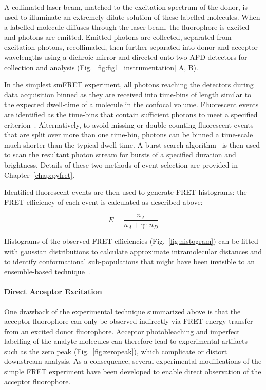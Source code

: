 A collimated laser beam, matched to the excitation spectrum of the donor, is used to illuminate an extremely dilute solution of these labelled molecules. When a labelled molecule diffuses through the laser beam, the fluorophore is excited and photons are emitted.  Emitted photons are collected, separated from excitation photons, recollimated, then further separated into donor and acceptor wavelengths using a dichroic mirror and directed onto two APD detectors for collection and analysis (Fig.~\ref{fig:fig1_instrumentation} A, B).

In the simplest smFRET experiment, all photons reaching the detectors during data acquisition binned as they are received into time-bins of length similar to the expected dwell-time of a molecule in the confocal volume. Fluorescent events are identified as the time-bins that contain sufficient photons to meet a specified criterion~\cite{weiss00}. Alternatively, to avoid missing or double counting fluorescent events that are split over more than one time-bin, photons can be binned a time-scale much shorter than the typical dwell time. A burst search algorithm~\cite{nir06} is then used to scan the resultant photon stream for bursts of a specified duration and brightness. Details of these two methods of event selection are provided in Chapter~\ref{chap:pyfret}.

Identified fluorescent events are then used to generate FRET histograms: the FRET efficiency of each event is calculated as described above:

\begin{equation}
E = \frac{n_A}{n_A + \gamma \cdot n_D}
\label{eq:Eprod}
\end{equation} 

Histograms of the observed FRET efficiencies (Fig.~\ref{fig:histogram}) can be fitted with gaussian distributions to calculate approximate intramolecular distances and to identify conformational sub-populations that might have been invisible to an ensemble-based technique~\cite{joo08, Walter2008}.

\paragraph{Direct Acceptor Excitation}
One drawback of the experimental technique summarized above is that the acceptor fluorophore can only be observed indirectly via FRET energy transfer from an excited donor fluorophore. Acceptor photobleaching and imperfect labelling of the analyte molecules can therefore lead to experimental artifacts such as the zero peak (Fig.~\ref{fig:zeropeak}), which complicate or distort downstream analysis. As a consequence, several experimental modifications of the simple FRET experiment have been developed to enable direct observation of the acceptor fluorophore.

